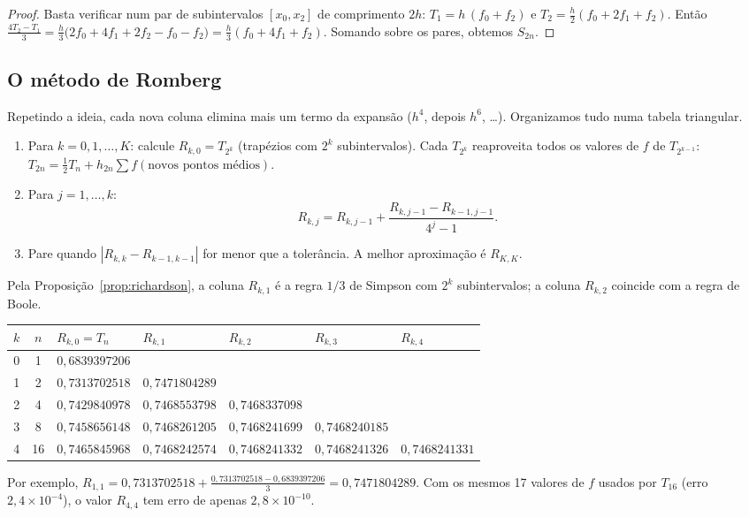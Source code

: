 \begin{proof}
Basta verificar num par de subintervalos $[x_0,x_2]$ de comprimento $2h$:
$T_1=h\,(f_0+f_2)$ e $T_2=\frac h2(f_0+2f_1+f_2)$. Então
$\frac{4T_2-T_1}{3}=\frac{h}{3}\bigl(2f_0+4f_1+2f_2-f_0-f_2\bigr)=\frac h3(f_0+4f_1+f_2)$.
Somando sobre os pares, obtemos $S_{2n}$.
\end{proof}

\subsection{O método de Romberg}

Repetindo a ideia, cada nova coluna elimina mais um termo da expansão ($h^4$, depois $h^6$,
\dots). Organizamos tudo numa tabela triangular.

\begin{tcolorbox}[colback=azul!3,colframe=azul!60,title={Algoritmo: método de Romberg},fonttitle=\bfseries]
\begin{enumerate}[nosep]
  \item Para $k=0,1,\dots,K$: calcule $R_{k,0}=T_{2^k}$ (trapézios com $2^k$ subintervalos).
        Cada $T_{2^k}$ reaproveita todos os valores de $f$ de $T_{2^{k-1}}$:
        $T_{2n}=\frac12T_n+h_{2n}\sum f(\text{novos pontos médios})$.
  \item Para $j=1,\dots,k$:
        \[
        R_{k,j}=R_{k,j-1}+\frac{R_{k,j-1}-R_{k-1,j-1}}{4^j-1}.
        \]
  \item Pare quando $|R_{k,k}-R_{k-1,k-1}|$ for menor que a tolerância. A melhor aproximação
        é $R_{K,K}$.
\end{enumerate}
\end{tcolorbox}

Pela Proposição~\ref{prop:richardson}, a coluna $R_{k,1}$ é a regra $1/3$ de Simpson com $2^k$
subintervalos; a coluna $R_{k,2}$ coincide com a regra de Boole.

\begin{exemplo}[: Romberg para $\int_0^1 e^{-x^2}\,dx$ com $K=4$]
\begin{center}
\renewcommand{\arraystretch}{1.3}
\small
\begin{tabular}{c|c|lllll}
$k$ & $n$ & $R_{k,0}=T_n$ & $R_{k,1}$ & $R_{k,2}$ & $R_{k,3}$ & $R_{k,4}$\\ \hline
0 & 1 & $0{,}6839397206$ & & & & \\
1 & 2 & $0{,}7313702518$ & $0{,}7471804289$ & & & \\
2 & 4 & $0{,}7429840978$ & $0{,}7468553798$ & $0{,}7468337098$ & & \\
3 & 8 & $0{,}7458656148$ & $0{,}7468261205$ & $0{,}7468241699$ & $0{,}7468240185$ & \\
4 & 16 & $0{,}7465845968$ & $0{,}7468242574$ & $0{,}7468241332$ & $0{,}7468241326$ & $0{,}7468241331$
\end{tabular}
\end{center}
Por exemplo, $R_{1,1}=0{,}7313702518+\frac{0{,}7313702518-0{,}6839397206}{3}=0{,}7471804289$.
Com os mesmos 17 valores de $f$ usados por $T_{16}$ (erro $2{,}4\times10^{-4}$), o valor
$R_{4,4}$ tem erro de apenas $2{,}8\times10^{-10}$.
\end{exemplo}

